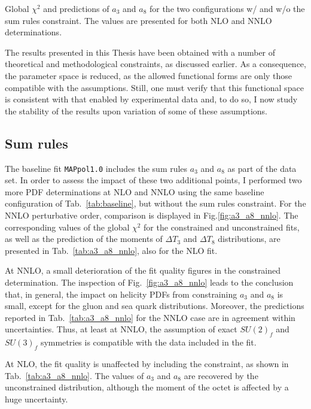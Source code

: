 \begin{table}[t!]
  \centering
  \small
  
  \caption{
    \small
    Global $\chi^2$ and predictions of $a_3$ and $a_8$ for the two configurations w/ and w/o the sum rules constraint. The values are presented for both NLO and NNLO determinations.
  \label{tab:a3_a8_nnlo}}
\end{table}

The results presented in this Thesis have been obtained with a number of theoretical and methodological constraints, as discussed earlier. As a consequence, the parameter space is reduced, as the allowed functional forms are only those compatible with the assumptions. Still, one must verify that this functional space is consistent with that enabled by experimental data and, to do so, I now study the stability of the results upon variation of some of these assumptions.

\subsection*{Sum rules}
The baseline fit \texttt{MAPpol1.0} includes the sum rules $a_3$ and $a_8$ as part of the data set. In order to assess the impact of these two additional points, I performed two more PDF determinations at NLO and NNLO using the same baseline configuration of Tab.~\ref{tab:baseline}, but without the sum rules constraint. For the NNLO perturbative order, comparison is displayed in Fig.\ref{fig:a3_a8_nnlo}. The corresponding values of the global $\chi^2$ for the constrained and unconstrained fits, as well as the prediction of the moments of $\Delta T_3$ and $\Delta T_8$ distributions, are presented in Tab.~\ref{tab:a3_a8_nnlo}, also for the NLO fit.%

At NNLO, a small deterioration of the fit quality figures in the constrained determination. The inspection of Fig.~\ref{fig:a3_a8_nnlo} leads to the conclusion that, in general, the impact on helicity PDFs from constraining $a_3$ and $a_8$ is small, except for the gluon and sea quark distributions. Moreover, the predictions reported in Tab.~\ref{tab:a3_a8_nnlo} for the NNLO case are in agreement within uncertainties. Thus, at least at NNLO, the assumption of exact $SU(2)_f$ and $SU(3)_f$ symmetries is compatible with the data included in the fit.%

At NLO, the fit quality is unaffected by including the constraint, as shown in Tab.~\ref{tab:a3_a8_nnlo}. The values of $a_3$ and $a_8$ are recovered by the unconstrained distribution, although the moment of the octet is affected by a huge uncertainty.%

